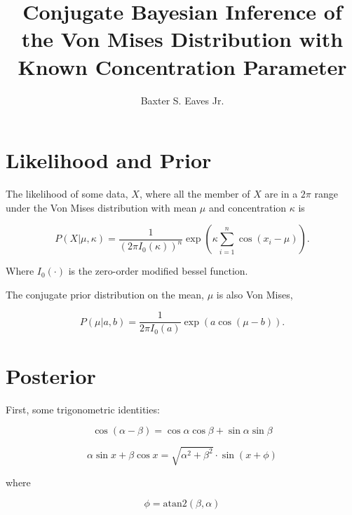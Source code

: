 \documentclass[letterpaper,11pt]{article}
\begin{document}
	\title{Conjugate Bayesian Inference of the Von Mises Distribution with Known Concentration Parameter}
	\author{Baxter S. Eaves Jr.}

	\maketitle


	\section{Likelihood and Prior}

	The likelihood of some data, $X$, where all the member of $X$ are in a $2\pi$ range under the Von Mises distribution with mean $\mu$ and concentration $\kappa$ is

	\begin{equation}
		P(X|\mu,\kappa) = \frac{1}{ \left(2\pi I_0(\kappa)\right)^n}\exp\left( \kappa \sum_{i=1}^n \cos(x_i-\mu)\right).
	\end{equation}

	\noindent
	Where $I_0(\cdot)$ is the zero-order modified bessel function.

	The conjugate prior distribution on the mean, $\mu$ is also Von Mises,

	\begin{equation}
		\label{eqn:prior}
		P(\mu|a,b) = \frac{1}{2\pi I_0(a)}\exp\left( a \cos(\mu-b)\right).
	\end{equation}


	\section{Posterior}

	First, some trigonometric identities:

	\begin{equation}
		\cos(\alpha - \beta) = \cos\alpha\cos\beta + \sin\alpha\sin\beta
	\end{equation}

	\begin{equation}
		\label{eqn:lincomb}
		\alpha\sin x + \beta\cos x = \sqrt{ \alpha^2 + \beta^2} \cdot \sin(x+\phi)
	\end{equation}

	\noindent
	where

	\begin{equation}
		\label{eqn:phi}
		\phi = \text{atan2}\left(\beta,\alpha \right)
	\end{equation}
\end{document}
